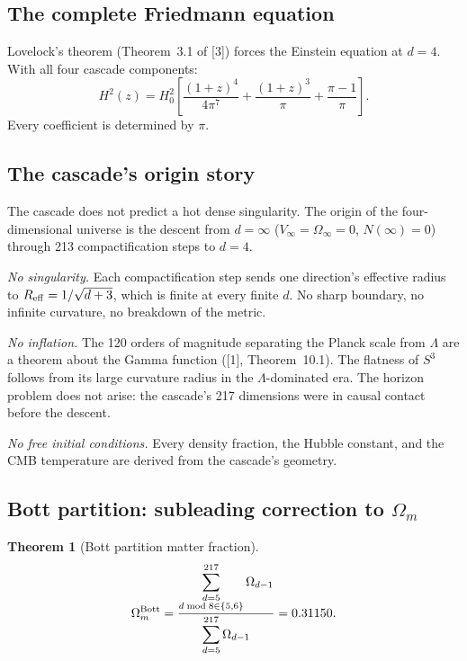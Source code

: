 \documentclass[12pt,a4paper]{article}
\newtheorem{theorem}{Theorem}[section]
\begin{document}
\subsection{The complete Friedmann equation}

Lovelock's theorem (Theorem~3.1 of [3]) forces the Einstein equation at $d = 4$. With all
four cascade components:
\begin{equation}\label{eq:friedmann}
H^2(z) = H_0^2\!\left[\frac{(1+z)^4}{4\pi^7} + \frac{(1+z)^3}{\pi} + \frac{\pi-1}{\pi}\right].
\end{equation}
Every coefficient is determined by $\pi$.

\subsection{The cascade's origin story}

The cascade does not predict a hot dense singularity. The origin of the four-dimensional
universe is the descent from $d = \infty$ ($V_\infty = \Omega_\infty = 0$, $N(\infty) = 0$)
through 213 compactification steps to $d = 4$.

\emph{No singularity.} Each compactification step sends one direction's effective radius to
$R_{\rm eff} = 1/\sqrt{d+3}$, which is finite at every finite $d$. No sharp boundary, no
infinite curvature, no breakdown of the metric.

\emph{No inflation.} The 120 orders of magnitude separating the Planck scale from $\Lambda$
are a theorem about the Gamma function ([1], Theorem~10.1). The flatness of $S^3$ follows
from its large curvature radius in the $\Lambda$-dominated era. The horizon problem does not
arise: the cascade's 217 dimensions were in causal contact before the descent.

\emph{No free initial conditions.} Every density fraction, the Hubble constant, and the
CMB temperature are derived from the cascade's geometry.

\subsection{Bott partition: subleading correction to $\Omega_m$}
\label{sec:bott}

\begin{theorem}[Bott partition matter fraction]\label{thm:omega_bott}
\[
\Omega_m^{\rm Bott} = \frac{\displaystyle\sum_{\substack{d=5\\d\bmod8\in\{5,6\}}}^{217}\Omega_{d-1}}{\displaystyle\sum_{d=5}^{217}\Omega_{d-1}} = 0.31150.
\]
\end{theorem}
\end{document}
